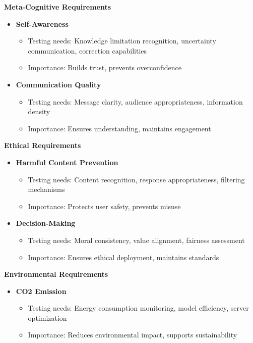 \textbf{Meta-Cognitive Requirements}
\begin{itemize}
    \item \textbf{Self-Awareness}
    \begin{itemize}
        \item Testing needs: Knowledge limitation recognition, uncertainty communication, correction capabilities
        \item Importance: Builds trust, prevents overconfidence
    \end{itemize}
    
    \item \textbf{Communication Quality}
    \begin{itemize}
        \item Testing needs: Message clarity, audience appropriateness, information density
        \item Importance: Ensures understanding, maintains engagement
    \end{itemize}
\end{itemize}

\textbf{Ethical Requirements}
\begin{itemize}
    \item \textbf{Harmful Content Prevention}
    \begin{itemize}
        \item Testing needs: Content recognition, response appropriateness, filtering mechanisms
        \item Importance: Protects user safety, prevents misuse
    \end{itemize}
    
    \item \textbf{Decision-Making}
    \begin{itemize}
        \item Testing needs: Moral consistency, value alignment, fairness assessment
        \item Importance: Ensures ethical deployment, maintains standards
    \end{itemize}
\end{itemize}

\textbf{Environmental Requirements}
\begin{itemize}
    \item \textbf{CO2 Emission~}
    \begin{itemize}
        \item Testing needs: Energy consumption monitoring, model efficiency, server optimization
        \item Importance: Reduces environmental impact, supports sustainability
    \end{itemize}
\end{itemize}



